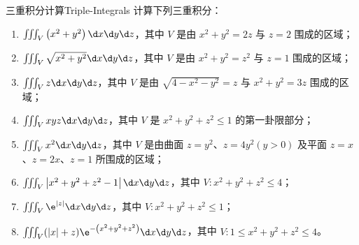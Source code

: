 \begin{problem}{三重积分计算}{Triple-Integrals}
    计算下列三重积分：
    \begin{enumerate}
        \item $\iiint_{V}\left(x^{2}+y^{2}\right) \d x \d y \d z$，其中 $V$ 是由 $x^{2}+y^{2}=2 z$ 与 $z=2$ 围成的区域；
        \item $\iiint_{V} \sqrt{x^{2}+y^{2}} \d x \d y \d z$，其中 $V$ 是由 $x^{2}+y^{2}=z^{2}$ 与 $z=1$ 围成的区域；
        \item $\iiint_{V} z \d x \d y \d z$，其中 $V$ 是由 $\sqrt{4-x^{2}-y^{2}}=z$ 与 $x^{2}+y^{2}=3 z$ 围成的区域；
        \item $\iiint_{V} x y z \d x \d y \d z$，其中 $V$ 是 $x^{2}+y^{2}+z^{2} \leqslant 1$ 的第一卦限部分；
        \item $\iiint_{V} x^{2} \d x \d y \d z$，其中 $V$ 是由曲面 $z=y^{2}$、$z=4 y^{2}(y>0)$ 及平面 $z=x$、$z=2 x$、$z=1$ 所围成的区域；
        \item $\iiint_{V}\left|x^{2}+y^{2}+z^{2}-1\right| \d x \d y \d z$，其中 $V: x^{2}+y^{2}+z^{2} \leqslant 4$；
        \item $\iiint_{V} \e^{|z|} \d x \d y \d z$，其中 $V: x^{2}+y^{2}+z^{2} \leqslant 1$；
        \item $\iiint_{V}(|x|+z) \e^{-\left(x^{2}+y^{2}+z^{2}\right)} \d x \d y \d z$，其中 $V: 1 \leqslant x^{2}+y^{2}+z^{2} \leqslant 4$。
    \end{enumerate}
\end{problem}

